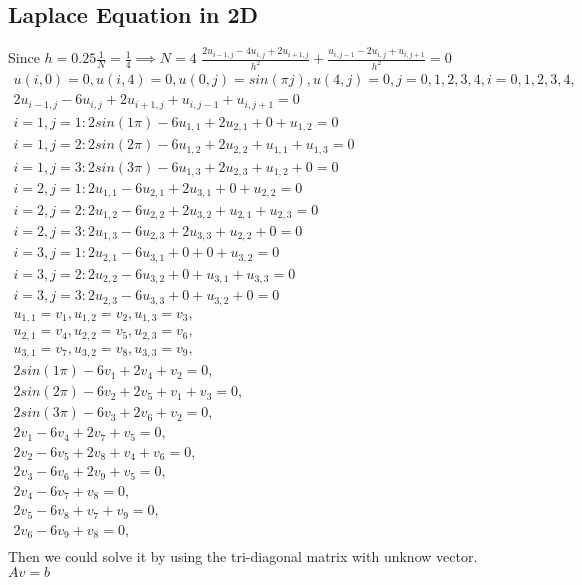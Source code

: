 \subsection{Laplace Equation in 2D}
Since $h=0.25\frac{1}{N}=\frac{1}{4}\implies N=4$
$\frac{2u_{i-1,j}-4u_{i,j}+2u_{i+1,j}}{h^2}+\frac{u_{i,j-1}-2u_{i,j}+u_{i,j+1}}{h^2}=0$
\[\begin{aligned}
  u(i,0)=0,u(i,4)=0,u(0,j)=sin(\pi j),u(4,j)=0,j=0,1,2,3,4,i=0,1,2,3,4,\\
  2u_{i-1,j}-6u_{i,j}+2u_{i+1,j}+u_{i,j-1}+u_{i,j+1}=0\\
  i=1,j=1:2sin(1\pi )-6u_{1,1}+2u_{2,1}+0+u_{1,2}=0\\
  i=1,j=2:2sin(2\pi )-6u_{1,2}+2u_{2,2}+u_{1,1}+u_{1,3}=0\\
  i=1,j=3:2sin(3\pi )-6u_{1,3}+2u_{2,3}+u_{1,2}+0=0\\
  i=2,j=1:2u_{1,1}-6u_{2,1}+2u_{3,1}+0+u_{2,2}=0\\
  i=2,j=2:2u_{1,2}-6u_{2,2}+2u_{3,2}+u_{2,1}+u_{2,3}=0\\
  i=2,j=3:2u_{1,3}-6u_{2,3}+2u_{3,3}+u_{2,2}+0=0\\
  i=3,j=1:2u_{2,1}-6u_{3,1}+0+0+u_{3,2}=0\\
  i=3,j=2:2u_{2,2}-6u_{3,2}+0+u_{3,1}+u_{3,3}=0\\
  i=3,j=3:2u_{2,3}-6u_{3,3}+0+u_{3,2}+0=0\\
  u_{1,1}=v_1,u_{1,2}=v_2,u_{1,3}=v_3,\\
  u_{2,1}=v_4,u_{2,2}=v_5,u_{2,3}=v_6,\\
  u_{3,1}=v_7,u_{3,2}=v_8,u_{3,3}=v_9,\\
  2sin(1\pi )-6v_1+2v_4+v_2=0,\\
  2sin(2\pi )-6v_2+2v_5+v_1+v_3=0,\\
  2sin(3\pi )-6v_3+2v_6+v_2=0,\\
  2v_1-6v_4+2v_7+v_5=0,\\
  2v_2-6v_5+2v_8+v_4+v_6=0,\\
  2v_3-6v_6+2v_9+v_5=0,\\
  2v_4-6v_7+v_8=0,\\
  2v_5-6v_8+v_7+v_9=0,\\
  2v_6-6v_9+v_8=0,\\
\end{aligned}\]Then we could solve it by using the tri-diagonal matrix with unknow vector.$Av=b$
\newpage
